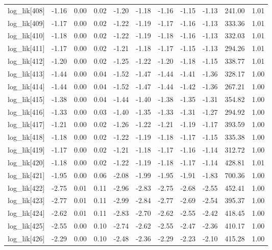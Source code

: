 \begin{table}[ht]
\begin{tabular}{rrrrrrrrrrr}
  log\_lik[408] & -1.16 & 0.00 & 0.02 & -1.20 & -1.18 & -1.16 & -1.15 & -1.13 & 241.00 & 1.01 \\ 
  log\_lik[409] & -1.17 & 0.00 & 0.02 & -1.22 & -1.19 & -1.17 & -1.16 & -1.13 & 333.36 & 1.01 \\ 
  log\_lik[410] & -1.18 & 0.00 & 0.02 & -1.22 & -1.19 & -1.18 & -1.16 & -1.13 & 332.03 & 1.01 \\ 
  log\_lik[411] & -1.17 & 0.00 & 0.02 & -1.21 & -1.18 & -1.17 & -1.15 & -1.13 & 294.26 & 1.01 \\ 
  log\_lik[412] & -1.20 & 0.00 & 0.02 & -1.25 & -1.22 & -1.20 & -1.18 & -1.15 & 338.77 & 1.01 \\ 
  log\_lik[413] & -1.44 & 0.00 & 0.04 & -1.52 & -1.47 & -1.44 & -1.41 & -1.36 & 328.17 & 1.00 \\ 
  log\_lik[414] & -1.44 & 0.00 & 0.04 & -1.52 & -1.47 & -1.44 & -1.42 & -1.36 & 267.21 & 1.00 \\ 
  log\_lik[415] & -1.38 & 0.00 & 0.04 & -1.44 & -1.40 & -1.38 & -1.35 & -1.31 & 354.82 & 1.00 \\ 
  log\_lik[416] & -1.33 & 0.00 & 0.03 & -1.40 & -1.35 & -1.33 & -1.31 & -1.27 & 294.92 & 1.00 \\ 
  log\_lik[417] & -1.21 & 0.00 & 0.02 & -1.26 & -1.22 & -1.21 & -1.19 & -1.17 & 393.59 & 1.00 \\ 
  log\_lik[418] & -1.18 & 0.00 & 0.02 & -1.22 & -1.19 & -1.18 & -1.17 & -1.15 & 335.38 & 1.00 \\ 
  log\_lik[419] & -1.17 & 0.00 & 0.02 & -1.21 & -1.18 & -1.17 & -1.16 & -1.14 & 312.72 & 1.00 \\ 
  log\_lik[420] & -1.18 & 0.00 & 0.02 & -1.22 & -1.19 & -1.18 & -1.17 & -1.14 & 428.81 & 1.01 \\ 
  log\_lik[421] & -1.95 & 0.00 & 0.06 & -2.08 & -1.99 & -1.95 & -1.91 & -1.83 & 700.36 & 1.00 \\ 
  log\_lik[422] & -2.75 & 0.01 & 0.11 & -2.96 & -2.83 & -2.75 & -2.68 & -2.55 & 452.41 & 1.00 \\ 
  log\_lik[423] & -2.77 & 0.01 & 0.11 & -2.99 & -2.84 & -2.77 & -2.69 & -2.54 & 395.37 & 1.00 \\ 
  log\_lik[424] & -2.62 & 0.01 & 0.11 & -2.83 & -2.70 & -2.62 & -2.55 & -2.42 & 418.45 & 1.00 \\ 
  log\_lik[425] & -2.55 & 0.00 & 0.10 & -2.74 & -2.62 & -2.55 & -2.47 & -2.36 & 410.17 & 1.00 \\ 
  log\_lik[426] & -2.29 & 0.00 & 0.10 & -2.48 & -2.36 & -2.29 & -2.23 & -2.10 & 415.28 & 1.00 \\ 

\end{tabular}
\end{table}
